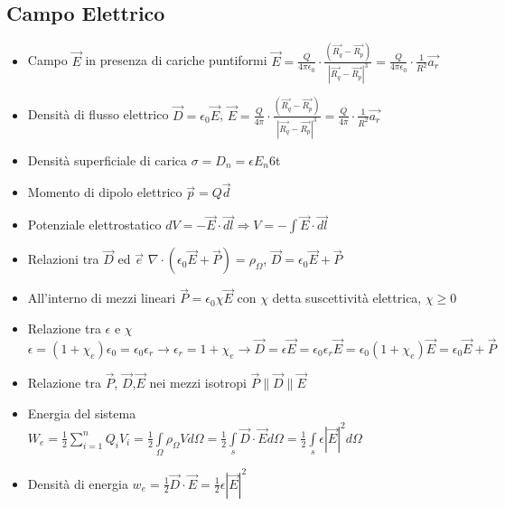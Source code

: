 \documentclass{article}
\begin{document}
\subsection{Campo Elettrico}
\begin{itemize}
	\item Campo \(\vec{E}\) in presenza di cariche puntiformi \( \vec{E} = \frac{Q}{4 \pi \epsilon_0} \cdot \frac{(\vec{R_q} - \vec{R_p})}{| \vec{R_q} - \vec{R_p} | ^3 } = \frac{Q}{4 \pi \epsilon_0} \cdot \frac{1}{R^2} \vec{a_r} \)
	\item Densità di flusso elettrico \( \vec{D} = \epsilon_0 \vec{E} \),  \( \vec{E} = \frac{Q}{4 \pi} \cdot \frac{(\vec{R_q} - \vec{R_p})}{| \vec{R_q} - \vec{R_p} | ^3 } = \frac{Q}{4 \pi} \cdot \frac{1}{R^2} \vec{a_r} \)
	\item Densità superficiale di carica \( \sigma = D_n = \epsilon E_n \)6t
	\item Momento di dipolo elettrico \( \vec{p} = Q \vec{d} \)
	\item Potenziale elettrostatico \(dV = -\vec{E} \cdot \vec{dl} \Rightarrow V = -\int{\vec{E} \cdot \vec{dl}} \)
	\item Relazioni tra \(\vec{D}\) ed \(\vec{e}\) \( \nabla \cdot (\epsilon_0 \vec{E} + \vec{P} ) = \rho_\Omega \), \( \vec{D} = \epsilon_0 \vec{E} + \vec{P} \)
	\item All'interno di mezzi lineari \(\vec{P} = \epsilon_0 \chi \vec{E} \) con \(\chi\) detta suscettività elettrica, \(\chi \geq  0\)
	\item Relazione tra \(\epsilon\) e \(\chi\) \(\epsilon = (1 + \chi_e) \epsilon_0 = \epsilon_0 \epsilon_r \rightarrow \epsilon_r = 1 + \chi_e \rightarrow \vec{D} = \epsilon \vec{E} = \epsilon_0 \epsilon_r \vec{E} = \epsilon_0 (1 + \chi_e) \vec{E} = \epsilon_0 \vec{E} + \vec{P} \)
	\item Relazione tra \(\vec{P}\), \(\vec{D}\),\(\vec{E}\) nei mezzi isotropi \(\vec{P}\|\vec{D}\|\vec{E}\)
	\item Energia del sistema \( W_e = \frac{1}{2} \sum\limits_{i=1}^{n}Q_iV_i = \frac{1}{2} \int\limits_\Omega \rho_\Omega V d\Omega = \frac{1}{2} \int\limits_{s} \vec{D} \cdot \vec{E} d\Omega = \frac{1}{2} \int\limits_{s} \epsilon |\vec{E}|^2 d\Omega \)
	\item Densità di energia \( w_e = \frac{1}{2} \vec{D} \cdot \vec{E} = \frac{1}{2} \epsilon |\vec{E}|^2 \)
\end{itemize}
\end{document}
